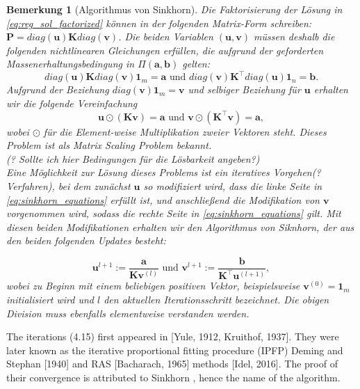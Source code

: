 \documentclass[11pt,a4paper]{article}
\newtheorem{remark}[theorem]{Bemerkung}
\numberwithin{equation}{section}
\begin{document}
	
	\begin{remark}[Algorithmus von Sinkhorn]
		Die Faktorisierung der Lösung in \autoref{eq:reg_sol_factorized} können in der folgenden Matrix-Form schreiben: $\boldsymbol{P} = diag(\boldsymbol{u}) \boldsymbol{K} diag(\boldsymbol{v})$. Die beiden Variablen $(\boldsymbol{u}, \boldsymbol{v})$ müssen deshalb die folgenden nichtlinearen Gleichungen erfüllen, die aufgrund der geforderten Massenerhaltungsbedingung in $\Pi (\boldsymbol{a},\boldsymbol{b})$ gelten:
		\begin{equation}
		diag(\boldsymbol{u}) \boldsymbol{K} diag(\boldsymbol{v})\boldsymbol{1}_m = \boldsymbol{a} \text{ und }
		diag(\boldsymbol{v}) \boldsymbol{K}^\top diag(\boldsymbol{u})\boldsymbol{1}_n = \boldsymbol{b}.
		\end{equation}
		Aufgrund der Beziehung $diag(\boldsymbol{v})\boldsymbol{1}_m =  \boldsymbol{v}$ und selbiger Beziehung für $\boldsymbol{u}$ erhalten wir die folgende Vereinfachung
		\begin{equation}
		\boldsymbol{u} \odot (\boldsymbol{K}\boldsymbol{v}) = \boldsymbol{a} \text{ und }
		\boldsymbol{v} \odot (\boldsymbol{K}^\top \boldsymbol{v}) = \boldsymbol{a}, \label{eq:sinkhorn_equations}
		\end{equation}  
		wobei $\odot$ für die Element-weise Multiplikation zweier Vektoren steht. Dieses Problem ist als \textit{Matrix Scaling Problem} \cite{matrix_scaling} bekannt.\\
		(? Sollte ich hier Bedingungen für die Lösbarkeit angeben?) \\
		Eine Möglichkeit zur Lösung dieses Problems ist ein iteratives Vorgehen(?Verfahren), bei dem zunächst $\boldsymbol{u}$ so modifiziert wird, dass die linke Seite in \autoref{eq:sinkhorn_equations} erfüllt ist, und anschließend die Modifikation von $\boldsymbol{v}$ vorgenommen wird, sodass die rechte Seite in \autoref{eq:sinkhorn_equations} gilt. Mit diesen beiden Modifikationen erhalten wir den Algorithmus von Siknhorn, der aus den beiden folgenden Updates besteht:
		
		\begin{equation}
		\boldsymbol{u}^{l+1}:= \frac{\boldsymbol{a}}{\boldsymbol{K}\boldsymbol{v}^{(l)}} \text{ und }
		\boldsymbol{v}^{l+1}:= \frac{\boldsymbol{b}}{\boldsymbol{K}^\top \boldsymbol{u}^{(l+1)}},
		\end{equation} 
		wobei zu Beginn mit einem beliebigen positiven Vektor, beispielsweise $\boldsymbol{v}^{(0)} = \boldsymbol{1}_m$ initialisiert wird und $l$ den aktuellen Iterationsschritt bezeichnet. Die obigen Division muss ebenfalls elementweise verstanden werden.
	\end{remark}
		The iterations (4.15) first appeared in [Yule, 1912,
		Kruithof, 1937]. They were later known as the iterative proportional fitting procedure
		(IPFP) Deming and Stephan [1940] and RAS [Bacharach, 1965] methods [Idel, 2016].
		The proof of their convergence is attributed to Sinkhorn \cite{sinkhorn1964relationship}, hence the name of the
		algorithm.
		
\end{document}
